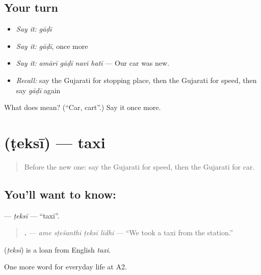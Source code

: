 \subsection*{Your turn}
\begin{itemize}
\raggedright
  \item \emph{Say it:} \emph{gāḍī}
  \item \emph{Say it:} \emph{gāḍī}, once more
  \item \emph{Say it:} \emph{amārī gāḍī navī hatī} — Our car was new.
  \item \emph{Recall:} say the Gujarati for stopping place, then the Gujarati for speed, then say \emph{gāḍī} again
\end{itemize}

\begin{tcolorbox}[breakable,colback=teal!4,colframe=teal!35!black,title={Before you move on}]
What does  mean? (\textquotedblleft{}Car, cart\textquotedblright{}.) Say it once more.
\end{tcolorbox}
\section[\texorpdfstring{\gu{ટેક્સી} (ṭeksī)}{ટેક્સી (ṭeksī)}]{ (ṭeksī) — taxi}

\label{lesson:GU-C207-teksi}



\begin{quote}
Before the new one: say the Gujarati for speed, then the Gujarati for car.
\end{quote}

\subsection*{You'll want to know: }
\textbf{} — \emph{ṭeksī} — \textquotedblleft{}taxi\textquotedblright{}.

\begin{quote}
\textbf{   .} — \emph{ame sṭeśanthī ṭeksī līdhī} — \textquotedblleft{}We took a taxi from the station.\textquotedblright{}
\end{quote}

\begin{cousinweb}
\textbf{} (\emph{ṭeksī}) is a loan from English \emph{taxi}.
\end{cousinweb}

\begin{grammarlens}[title={What you've built}]
One more word for everyday life at A2.
\end{grammarlens}

